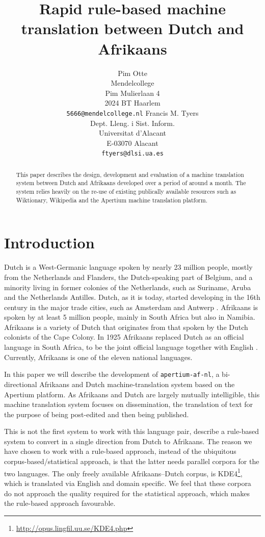 \documentclass[11pt]{article}
\title{Rapid rule-based machine translation between Dutch and Afrikaans}
\author{Pim Otte\\
  Mendelcollege\\
  Pim Mulierlaan 4\\
  2024 BT Haarlem\\
  {\tt 5666@mendelcollege.nl}  \And
  Francis M. Tyers\\
  Dept. Lleng. i Sist. Inform.\\
  Universitat d'Alacant\\
  E-03070 Alacant \\
  {\tt ftyers@dlsi.ua.es}}
\date{}
\begin{document}
\maketitle
\begin{abstract}
 This paper describes the design, development and evaluation of a machine
 translation system between Dutch and Afrikaans developed over a period of
 around a month. The system relies heavily on the re-use of existing 
 publically available resources such as Wiktionary, Wikipedia and the 
 Apertium machine translation platform.
\end{abstract}

\section{Introduction}

Dutch is a West-Germanic language spoken by nearly 23 million people, 
mostly from the Netherlands and Flanders, the Dutch-speaking part of Belgium, and a minority 
living in former colonies of the Netherlands, such as Suriname, Aruba and the Netherlands 
Antilles. Dutch, as it is today, started developing in the 16th century in the 
major trade cities, such as Amsterdam and Antwerp \cite{Shetter:02}.  Afrikaans is spoken 
by at least 5 million people, mainly in South Africa but also in Namibia. Afrikaans is a 
variety of Dutch that originates from that spoken by the Dutch colonists of 
the Cape Colony. In 1925 Afrikaans replaced Dutch as an official language in South Africa, to 
be the joint official language together with English \cite{Donaldson:93}. Currently, Afrikaans is one of the 
eleven national languages. 

In this paper we will describe the development of {\small {\tt apertium-af-nl}}, a bi-directional Afrikaans 
and Dutch machine-translation system based on the Apertium platform. As Afrikaans and Dutch 
are largely mutually intelligible, this machine translation system focuses on dissemination, the 
translation of text for the purpose of being post-edited and then being published. 

This is not the first system to work with this language pair,  describe
a rule-based system to convert in a single direction from Dutch to Afrikaans. 
The reason we have chosen to work with a rule-based approach, instead of the ubiquitous 
corpus-based/statistical approach, is that the latter needs parallel corpora for the two 
languages. The only freely available Afrikaans--Dutch corpus, is 
KDE4\footnote{\url{http://opus.lingfil.uu.se/KDE4.php}}, which is translated via English and 
domain specific. We feel that these corpora do not approach the quality required for the
statistical approach, which makes the rule-based approach favourable.
\end{document}
